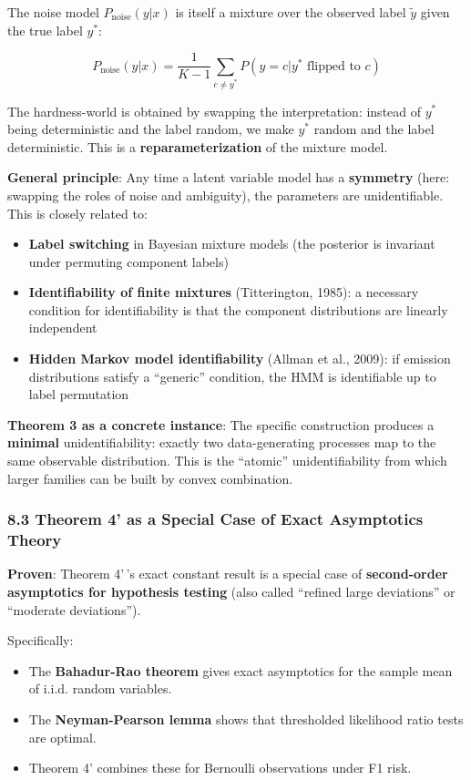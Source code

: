 \documentclass[
  12pt,
]{article}
\providecommand{\tightlist}{%
  \setlength{\itemsep}{0pt}\setlength{\parskip}{0pt}}
\begin{document}
The noise model \(P_{\text{noise}}(y | x)\) is itself a mixture over the
observed label \(\tilde{y}\) given the true label \(y^*\):

\[P_{\text{noise}}(y | x) = \frac{1}{K-1}\sum_{c \neq y^*} P(y = c | y^* \text{ flipped to } c)\]

The hardness-world is obtained by swapping the interpretation: instead
of \(y^*\) being deterministic and the label random, we make \(y^*\)
random and the label deterministic. This is a
\textbf{reparameterization} of the mixture model.

\textbf{General principle}: Any time a latent variable model has a
\textbf{symmetry} (here: swapping the roles of noise and ambiguity), the
parameters are unidentifiable. This is closely related to:

\begin{itemize}
\tightlist
\item
  \textbf{Label switching} in Bayesian mixture models (the posterior is
  invariant under permuting component labels)
\item
  \textbf{Identifiability of finite mixtures} (Titterington, 1985): a
  necessary condition for identifiability is that the component
  distributions are linearly independent
\item
  \textbf{Hidden Markov model identifiability} (Allman et al., 2009): if
  emission distributions satisfy a ``generic'' condition, the HMM is
  identifiable up to label permutation
\end{itemize}

\textbf{Theorem 3 as a concrete instance}: The specific construction
produces a \textbf{minimal} unidentifiability: exactly two
data-generating processes map to the same observable distribution. This
is the ``atomic'' unidentifiability from which larger families can be
built by convex combination.

\subsubsection{8.3 Theorem 4' as a Special Case of Exact Asymptotics
Theory}\label{theorem-4-as-a-special-case-of-exact-asymptotics-theory}

\textbf{Proven}: Theorem 4'\,'s exact constant result is a special case
of \textbf{second-order asymptotics for hypothesis testing} (also called
``refined large deviations'' or ``moderate deviations'').

Specifically:

\begin{itemize}
\tightlist
\item
  The \textbf{Bahadur-Rao theorem} gives exact asymptotics for the
  sample mean of i.i.d. random variables.
\item
  The \textbf{Neyman-Pearson lemma} shows that thresholded likelihood
  ratio tests are optimal.
\item
  Theorem 4' combines these for Bernoulli observations under F1 risk.
\end{itemize}
\end{document}
